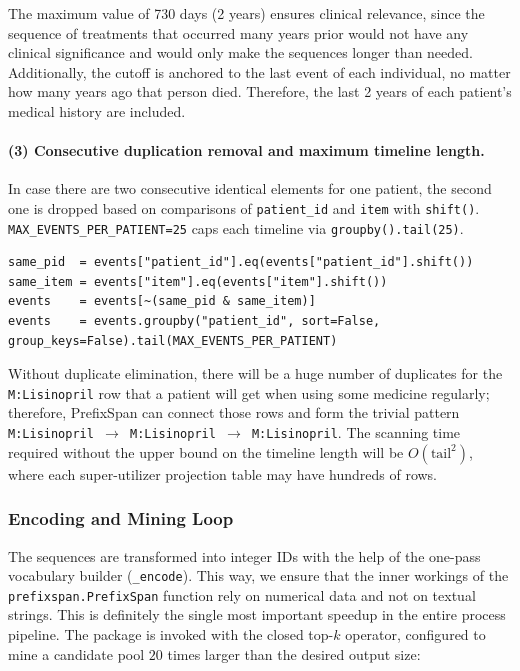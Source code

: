 \noindent The maximum value of 730 days (2 years) ensures clinical relevance, since the sequence of treatments that occurred many years prior would not have any clinical significance and would only make the sequences longer than needed. Additionally, the cutoff is anchored to the last event of each individual, no matter how many years ago that person died. Therefore, the last 2 years of each patient’s medical history are included.

\paragraph{(3) Consecutive duplication removal and maximum timeline length.} In case there are two consecutive identical elements for one patient, the second one is dropped based on comparisons of \texttt{patient\_id} and \texttt{item} with \texttt{shift()}. \texttt{MAX\_EVENTS\_PER\_PATIENT=25} caps each timeline via \texttt{groupby().tail(25)}.

\begin{lstlisting}[style=pythonstyle]
same_pid  = events["patient_id"].eq(events["patient_id"].shift())
same_item = events["item"].eq(events["item"].shift())
events    = events[~(same_pid & same_item)]
events    = events.groupby("patient_id", sort=False, group_keys=False).tail(MAX_EVENTS_PER_PATIENT)
\end{lstlisting}

\noindent Without duplicate elimination, there will be a huge number of duplicates for the \texttt{M:Lisinopril} row that a patient will get when using some medicine regularly; therefore, PrefixSpan can connect those rows and form the trivial pattern \texttt{M:Lisinopril \(\rightarrow\) M:Lisinopril \(\rightarrow\) M:Lisinopril}. The scanning time required without the upper bound on the timeline length will be \(O(\text{tail}^2)\), where each super-utilizer projection table may have hundreds of rows.

\subsubsection*{Encoding and Mining Loop}

The sequences are transformed into integer IDs with the help of the one-pass vocabulary builder (\texttt{\_encode}). This way, we ensure that the inner workings of the \texttt{prefixspan.PrefixSpan} function rely on numerical data and not on textual strings. This is definitely the single most important speedup in the entire process pipeline. The package is invoked with the closed top-\(k\) operator, configured to mine a candidate pool \(20\) times larger than the desired output size:

